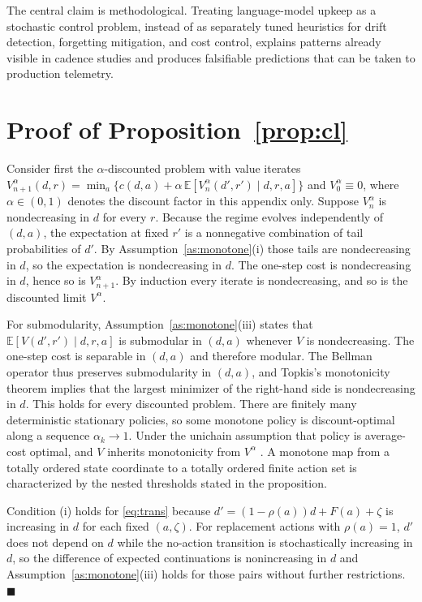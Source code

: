 \documentclass[journal]{IEEEtran}
\newcommand{\E}{\mathbb{E}}
\begin{document}
The central claim is methodological. Treating language-model upkeep as a stochastic control problem, instead of as separately tuned heuristics for drift detection, forgetting mitigation, and cost control, explains patterns already visible in cadence studies and produces falsifiable predictions that can be taken to production telemetry.

\appendices
\section{Proof of Proposition~\ref{prop:cl}}
Consider first the $\alpha$-discounted problem with value iterates $V^{\alpha}_{n+1}(d,r)=\min_a\{c(d,a)+\alpha\,\E[V^{\alpha}_n(d',r')\mid d,r,a]\}$ and $V^{\alpha}_0\equiv0$, where $\alpha\in(0,1)$ denotes the discount factor in this appendix only. Suppose $V^{\alpha}_n$ is nondecreasing in $d$ for every $r$. Because the regime evolves independently of $(d,a)$, the expectation at fixed $r'$ is a nonnegative combination of tail probabilities of $d'$. By Assumption~\ref{as:monotone}(i) those tails are nondecreasing in $d$, so the expectation is nondecreasing in $d$. The one-step cost is nondecreasing in $d$, hence so is $V^{\alpha}_{n+1}$. By induction every iterate is nondecreasing, and so is the discounted limit $V^{\alpha}$.

For submodularity, Assumption~\ref{as:monotone}(iii) states that $\E[V(d',r')\mid d,r,a]$ is submodular in $(d,a)$ whenever $V$ is nondecreasing. The one-step cost is separable in $(d,a)$ and therefore modular. The Bellman operator thus preserves submodularity in $(d,a)$, and Topkis's monotonicity theorem implies that the largest minimizer of the right-hand side is nondecreasing in $d$. This holds for every discounted problem. There are finitely many deterministic stationary policies, so some monotone policy is discount-optimal along a sequence $\alpha_k\to1$. Under the unichain assumption that policy is average-cost optimal, and $V$ inherits monotonicity from $V^{\alpha}$ \cite[Ch.~8]{puterman1994}. A monotone map from a totally ordered state coordinate to a totally ordered finite action set is characterized by the nested thresholds stated in the proposition.

Condition (i) holds for \eqref{eq:trans} because $d'=(1-\rho(a))d+F(a)+\zeta$ is increasing in $d$ for each fixed $(a,\zeta)$. For replacement actions with $\rho(a)=1$, $d'$ does not depend on $d$ while the no-action transition is stochastically increasing in $d$, so the difference of expected continuations is nonincreasing in $d$ and Assumption~\ref{as:monotone}(iii) holds for those pairs without further restrictions. \hfill$\blacksquare$
\end{document}
